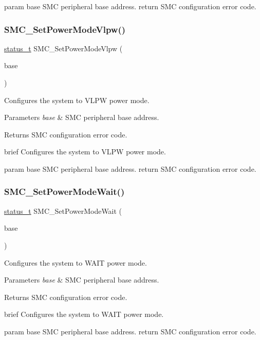 param base S\+MC peripheral base address. return S\+MC configuration error code. \mbox{\label{group__smc_ga69d0fb061423ef6ed718f3acee96ebf6}} 
\subsubsection{\texorpdfstring{SMC\_SetPowerModeVlpw()}{SMC\_SetPowerModeVlpw()}}
{\footnotesize\ttfamily \mbox{\hyperlink{group__ksdk__common_gaaabdaf7ee58ca7269bd4bf24efcde092}{status\+\_\+t}} S\+M\+C\+\_\+\+Set\+Power\+Mode\+Vlpw (\begin{DoxyParamCaption}\item[{\mbox{\hyperlink{struct_s_m_c___type}{S\+M\+C\+\_\+\+Type}} $\ast$}]{base }\end{DoxyParamCaption})}



Configures the system to V\+L\+PW power mode. 


\begin{DoxyParams}{Parameters}
{\em base} & S\+MC peripheral base address. \\
\hline
\end{DoxyParams}
\begin{DoxyReturn}{Returns}
S\+MC configuration error code.
\end{DoxyReturn}
brief Configures the system to V\+L\+PW power mode.

param base S\+MC peripheral base address. return S\+MC configuration error code. \mbox{\label{group__smc_gaaf1664f2d4a78b756e5e30f5433af975}} 
\subsubsection{\texorpdfstring{SMC\_SetPowerModeWait()}{SMC\_SetPowerModeWait()}}
{\footnotesize\ttfamily \mbox{\hyperlink{group__ksdk__common_gaaabdaf7ee58ca7269bd4bf24efcde092}{status\+\_\+t}} S\+M\+C\+\_\+\+Set\+Power\+Mode\+Wait (\begin{DoxyParamCaption}\item[{\mbox{\hyperlink{struct_s_m_c___type}{S\+M\+C\+\_\+\+Type}} $\ast$}]{base }\end{DoxyParamCaption})}



Configures the system to W\+A\+IT power mode. 


\begin{DoxyParams}{Parameters}
{\em base} & S\+MC peripheral base address. \\
\hline
\end{DoxyParams}
\begin{DoxyReturn}{Returns}
S\+MC configuration error code.
\end{DoxyReturn}
brief Configures the system to W\+A\+IT power mode.

param base S\+MC peripheral base address. return S\+MC configuration error code. 